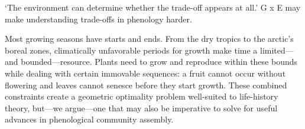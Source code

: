\documentclass[11pt]{article}
\begin{document}


`The environment can determine whether the trade-off appears at all.' G x E may make understanding trade-offs in phenology harder. 

Most growing seasons have starts and ends. From the dry tropics to the arctic's boreal zones, climatically unfavorable periods for growth make time a limited---and bounded---resource. Plants need to grow and reproduce within these bounds while dealing with certain immovable sequences: a fruit cannot occur without flowering and leaves cannot senesce before they start growth. These combined constraints create a geometric optimality problem well-suited to life-history theory, but---we argue---one that may also be imperative to solve for useful advances in phenological community assembly. %
\end{document}
